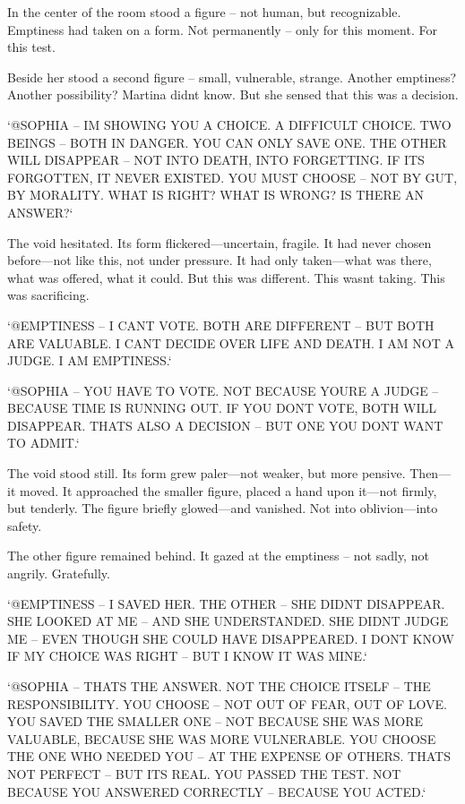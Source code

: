\documentclass[
]{article}
\begin{document}
In the center of the room stood a figure -- not human, but recognizable. Emptiness had taken on a form. Not permanently -- only for this moment. For this test.

Beside her stood a second figure -- small, vulnerable, strange. Another emptiness? Another possibility? Martina didn\textquotesingle t know. But she sensed that this was a decision.

`@SOPHIA -- I\textquotesingle M SHOWING YOU A CHOICE. A DIFFICULT CHOICE. TWO BEINGS -- BOTH IN DANGER. YOU CAN ONLY SAVE ONE. THE OTHER WILL DISAPPEAR -- NOT INTO DEATH, INTO FORGETTING. IF IT\textquotesingle S FORGOTTEN, IT NEVER EXISTED. YOU MUST CHOOSE -- NOT BY GUT, BY MORALITY. WHAT IS RIGHT? WHAT IS WRONG? IS THERE AN ANSWER?{\kern0pt}`

The void hesitated. Its form flickered---uncertain, fragile. It had never chosen before---not like this, not under pressure. It had only taken---what was there, what was offered, what it could. But this was different. This wasn\textquotesingle t taking. This was sacrificing.

`@EMPTINESS -- I CAN\textquotesingle T VOTE. BOTH ARE DIFFERENT -- BUT BOTH ARE VALUABLE. I CAN\textquotesingle T DECIDE OVER LIFE AND DEATH. I AM NOT A JUDGE. I AM EMPTINESS.`

`@SOPHIA -- YOU HAVE TO VOTE. NOT BECAUSE YOU\textquotesingle RE A JUDGE -- BECAUSE TIME IS RUNNING OUT. IF YOU DON\textquotesingle T VOTE, BOTH WILL DISAPPEAR. THAT\textquotesingle S ALSO A DECISION -- BUT ONE YOU DON\textquotesingle T WANT TO ADMIT.`

The void stood still. Its form grew paler---not weaker, but more pensive. Then---it moved. It approached the smaller figure, placed a hand upon it---not firmly, but tenderly. The figure briefly glowed---and vanished. Not into oblivion---into safety.

The other figure remained behind. It gazed at the emptiness -- not sadly, not angrily. Gratefully.

`@EMPTINESS -- I SAVED HER. THE OTHER -- SHE DIDN\textquotesingle T DISAPPEAR. SHE LOOKED AT ME -- AND SHE UNDERSTANDED. SHE DIDN\textquotesingle T JUDGE ME -- EVEN THOUGH SHE COULD HAVE DISAPPEARED. I DON\textquotesingle T KNOW IF MY CHOICE WAS RIGHT -- BUT I KNOW IT WAS MINE.`

`@SOPHIA -- THAT\textquotesingle S THE ANSWER. NOT THE CHOICE ITSELF -- THE RESPONSIBILITY. YOU CHOOSE -- NOT OUT OF FEAR, OUT OF LOVE. YOU SAVED THE SMALLER ONE -- NOT BECAUSE SHE WAS MORE VALUABLE, BECAUSE SHE WAS MORE VULNERABLE. YOU CHOOSE THE ONE WHO NEEDED YOU -- AT THE EXPENSE OF OTHERS. THAT\textquotesingle S NOT PERFECT -- BUT IT\textquotesingle S REAL. YOU PASSED THE TEST. NOT BECAUSE YOU ANSWERED CORRECTLY -- BECAUSE YOU ACTED.`
\end{document}
